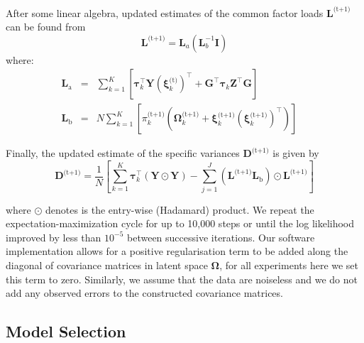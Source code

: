 \documentclass[twocolumn]{aastex62}
\newcommand{\vect}[1]{\boldsymbol{\mathbf{#1}}}
\renewcommand{\vec}[1]{\vect{#1}}
\newcommand{\weight}{\pi}
\newcommand{\data}{\textbf{Y}}
\newcommand{\vecdata}{\vec\data}
\newcommand{\nextstep}{^\textrm{(t+1)}}
\newcommand{\thisstep}{^\textrm{(t)}}
\newcommand{\transpose}{^\intercal}
\newcommand{\eye}{\textbf{I}}
\newcommand{\factorloads}{\textbf{L}}
\newcommand{\specificvariance}{\vec{D}}
\newcommand{\scoremeans}{\vec\xi}
\newcommand{\scorecovs}{\vec\Omega}
\newcommand{\NumData}{N}
\newcommand{\NumComponents}{K}
\newcommand{\numcomponents}{k}
\begin{document}
After some linear algebra, updated estimates of the common factor loads $\factorloads\nextstep$
can be found from
\begin{equation}
	\factorloads\nextstep = \factorloads_{a}\left(\factorloads_{b}^{-1}\eye\right)
\end{equation}
\noindent{}where:
\begin{eqnarray}
	\factorloads_\textrm{a} &=& \sum_{\numcomponents=1}^{\NumComponents}\left[ \vec\tau_\numcomponents\transpose\vecdata\left(\scoremeans_\numcomponents\thisstep\right)\transpose + 
	\vec{G}\transpose\vec\tau_\numcomponents\vec{Z}\transpose\vec{G}\right] \\
	\factorloads_\textrm{b} &=& N\sum_{\numcomponents=1}^{\NumComponents}\left[\weight_\numcomponents\nextstep\left(\scorecovs_\numcomponents\nextstep + \scoremeans_\numcomponents\nextstep\left(\scoremeans_\numcomponents\nextstep\right)\transpose\right)\right] \quad
\end{eqnarray}


Finally, the updated estimate of the specific variances $\specificvariance\nextstep$ is given
by
\begin{equation}
	\specificvariance\nextstep = \frac{1}{\NumData}\left[\sum^{\NumComponents}_{\numcomponents=1}\vec\tau_\numcomponents\transpose\left(\vecdata\odot\vecdata\right) - \sum_{j=1}^{J}\left(\factorloads\nextstep\factorloads_\textrm{b}\right)\odot\factorloads\nextstep\right]
\end{equation}

\noindent{}where $\odot$ denotes is the entry-wise (Hadamard) product. We repeat
the expectation-maximization cycle for up to 10,000 steps or until the log likelihood
improved by less than $10^{-5}$ between successive iterations. 
Our software implementation allows for a positive regularisation term to be added
along the diagonal of covariance matrices in latent space $\scorecovs$, for all experiments
here we set this term to zero. Similarly, we assume that the data are noiseless and
we do not add any observed errors to the constructed covariance matrices.




\subsection{Model Selection}
\end{document}
